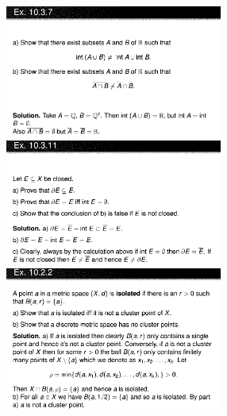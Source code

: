 \documentclass[8pt,landscape]{article}
\begin{document}
\begin{multicols}{3}
    \includegraphics[width=270]{Slides05.png} \\
    \includegraphics[width=270]{Slides06.png} \\
    \includegraphics[width=270]{Slides07.png} \\

\end{multicols}
\end{document}
